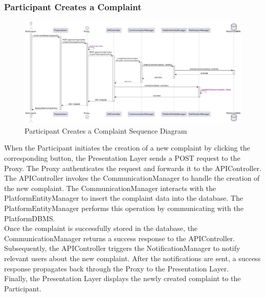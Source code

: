 \subsubsection*{Participant Creates a Complaint}
\begin{figure}[H]
    \centering
    \includegraphics[width=\linewidth]{Latex/Images/DD/SequenceDiagrams/17ParticipantCreatesAComplaint.png}
    \caption{Participant Creates a Complaint Sequence Diagram}
    \label{fig:partcratacomp}
\end{figure}
When the Participant initiates the creation of a new complaint by clicking the corresponding button, the Presentation Layer sends a POST request to the Proxy. The Proxy authenticates the request and forwards it to the APIController.\\
The APIController invokes the CommunicationManager to handle the creation of the new complaint. The CommunicationManager interacts with the PlatformEntityManager to insert the complaint data into the database. The PlatformEntityManager performs this operation by communicating with the PlatformDBMS.\\
Once the complaint is successfully stored in the database, the CommunicationManager returns a success response to the APIController. Subsequently, the APIController triggers the NotificationManager to notify relevant users about the new complaint. After the notifications are sent, a success response propagates back through the Proxy to the Presentation Layer.\\
Finally, the Presentation Layer displays the newly created complaint to the Participant.

